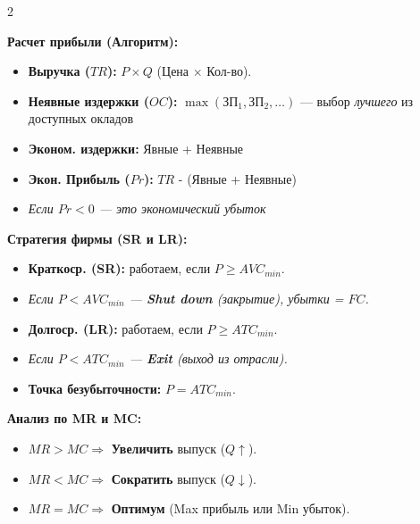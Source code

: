 \documentclass[14pt,a4paper]{article}
\newenvironment{insep}
	{\noindent\begin{minipage}{\linewidth}}
	{\hspace*{1cm}\end{minipage}}
\begin{document}
\begin{multicols}{2}
\begin{insep}
	\textbf{Расчет прибыли (Алгоритм):}
	\begin{itemize}
		\item \textbf{Выручка ($TR$):} $P \times Q$ (Цена $\times$ Кол-во).
		\item \textbf{Неявные издержки ($OC$):} $\max(\text{ЗП}_1, \text{ЗП}_2, \dots)$ --- выбор \textit{лучшего} из доступных окладов
		\item \textbf{Эконом. издержки:} Явные + Неявные
		\item \textbf{Экон. Прибыль ($Pr$):} $TR$ - (Явные + Неявные)
		\item \textit{Если $Pr < 0$ --- это экономический убыток}
	\end{itemize}
\end{insep}

\begin{insep}
	\textbf{Стратегия фирмы (SR и LR):}
	\begin{itemize} \setlength{\itemsep}{0pt}
		\item \textbf{Краткоср. (SR):} работаем, если $P \ge AVC_{min}$. 
		\item \textit{Если $P < AVC_{min}$ — \textbf{Shut down} (закрытие), убытки = $FC$.}
		\item \textbf{Долгоср. (LR):} работаем, если $P \ge ATC_{min}$.
		\item \textit{Если $P < ATC_{min}$ — \textbf{Exit} (выход из отрасли).}
		\item \textbf{Точка безубыточности:} $P = ATC_{min}$.
	\end{itemize}
	
	\textbf{Анализ по MR и MC:}
	\begin{itemize} \setlength{\itemsep}{0pt}
		\item $MR > MC \Rightarrow$ \textbf{Увеличить} выпуск ($Q \uparrow$).
		\item $MR < MC \Rightarrow$ \textbf{Сократить} выпуск ($Q \downarrow$).
		\item $MR = MC \Rightarrow$ \textbf{Оптимум} (Max прибыль или Min убыток).
	\end{itemize}
\end{insep}

\end{multicols}
\end{document}
